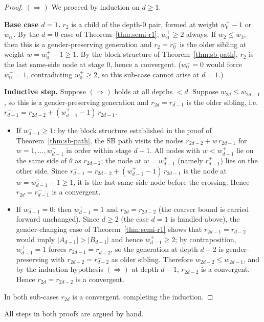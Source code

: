 \documentclass[12pt]{article}
\theoremstyle{definition}
\theoremstyle{remark}
\theoremstyle{plain}
\begin{document}
\begin{proof}
\medskip
\noindent$(\Rightarrow)$
We proceed by induction on $d \ge 1$.

\textbf{Base case $d = 1$.}
$r_2$ is a child of the depth-$0$ pair, formed at weight $w^+_0 - 1$ or $w^+_0$.
By the $d = 0$ case of Theorem~\ref{thm:semi-r1}, $w^+_0 \ge 2$ always.
If $w_{2} \le w_{3}$, then this is a gender-preserving generation and
$r_2 = r^-_0$ is the older sibling at weight $w = w^+_0 - 1 \ge 1$.
By the block structure of Theorem~\ref{thm:sb-path}, $r_2$ is the last same-side node
at stage $0$, hence a convergent.
($w^-_0 = 0$ would force $w^+_0 = 1$, contradicting $w^+_0 \ge 2$, so this sub-case
cannot arise at $d = 1$.)

\textbf{Inductive step.}
Suppose $(\Rightarrow)$ holds at all depths $< d$.
Suppose $w_{2d} \le w_{2d+1}$, so this is a gender-preserving generation
and $r_{2d} = r^-_{d-1}$ is the older sibling,
i.e.\ $r^-_{d-1} = r_{2d-2} + (w^+_{d-1} - 1)\,r_{2d-1}$.
\begin{itemize}
  \item If $w^-_{d-1} \ge 1$: by the block structure established in the proof of
  Theorem~\ref{thm:sb-path}, the SB path visits the nodes
  $r_{2d-2} + w\,r_{2d-1}$ for $w = 1, \ldots, w^+_{d-1}$ in order within
  stage $d-1$.  All nodes with $w < w^+_{d-1}$ lie on the same side of $\theta$
  as $r_{2d-2}$; the node at $w = w^+_{d-1}$ (namely $r^+_{d-1}$) lies on the
  other side.  Since $r^-_{d-1} = r_{2d-2} + (w^+_{d-1}-1)\,r_{2d-1}$ is the node at
  $w = w^+_{d-1} - 1 \ge 1$, it is the last same-side node before the crossing.
  Hence $r_{2d} = r^-_{d-1}$ is a convergent.
  \item If $w^-_{d-1} = 0$: then $w^+_{d-1} = 1$ and $r_{2d} = r_{2d-2}$
  (the coarser bound is carried forward unchanged).
  Since $d \ge 2$ (the case $d = 1$ is handled above), the gender-changing
  case of Theorem~\ref{thm:semi-r1} shows that $r_{2d-1} = r^-_{d-2}$ would imply
  $|A_{d-1}| > |B_{d-1}|$ and hence $w^+_{d-1} \ge 2$; by contraposition, $w^+_{d-1} = 1$
  forces $r_{2d-1} = r^+_{d-2}$, so the generation at depth $d-2$ is gender-preserving
  with $r_{2d-2} = r^-_{d-2}$ as older sibling.
  Therefore $w_{2d-2} \le w_{2d-1}$, and by the induction hypothesis $(\Rightarrow)$
  at depth $d-1$, $r_{2d-2}$ is a convergent.  Hence $r_{2d} = r_{2d-2}$ is a convergent.
\end{itemize}
In both sub-cases $r_{2d}$ is a convergent, completing the induction.
\end{proof}

All steps in both proofs are argued by hand.
\end{document}
